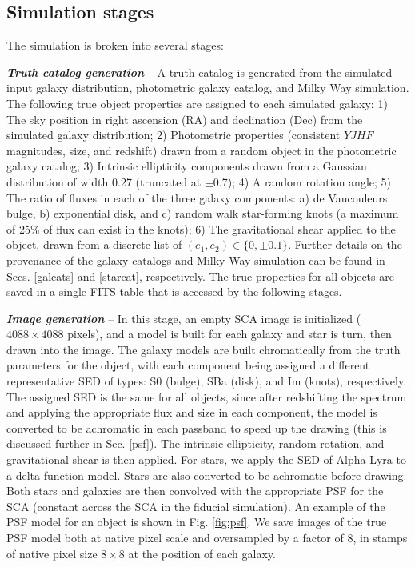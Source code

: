 \documentclass[aps,prd, amsmath,amssymb,superscriptaddress,showkeys,nofootinbib,reprint,preprintnumbers]{revtex4-1}
\begin{document}
\subsection{Simulation stages}\label{stages}

The simulation is broken into several stages:

\textbf{\textit{Truth catalog generation}} -- A truth catalog is generated from the simulated input galaxy distribution, photometric galaxy catalog, and Milky Way simulation. 
The following true object properties are assigned to each simulated galaxy:
1) The sky position in right ascension (RA) and declination (Dec) from the simulated galaxy distribution; 
2) Photometric properties (consistent $YJHF$ magnitudes, size, and redshift) drawn from a random object in the photometric galaxy catalog; 
3) Intrinsic ellipticity components drawn from a Gaussian distribution of width 0.27 (truncated at $\pm$0.7); 
4) A random rotation angle; 
5) The ratio of fluxes in each of the three galaxy components: a) de Vaucouleurs bulge, b) exponential disk, and c) random walk star-forming knots (a maximum of 25\% of flux can exist in the knots); 
6) The gravitational shear applied to the object, drawn from a discrete list of $(e_1, e_2) \in \{0,\pm 0.1\}$.
Further details on the provenance of the galaxy catalogs and Milky Way simulation can be found in Secs. \ref{galcats} and \ref{starcat}, respectively. 
The true properties for all objects are saved in a single FITS table that is accessed by the following stages.

\textbf{\textit{Image generation}} -- In this stage, an empty SCA image is initialized ($4088\times4088$ pixels), and a model is built for each galaxy and star is turn, then drawn into the image. 
The galaxy models are built chromatically from the truth parameters for the object, with each component being assigned a different representative SED of types: S0 (bulge), SBa (disk), and Im (knots), respectively. 
The assigned SED is the same for all objects, since after redshifting the spectrum and applying the appropriate flux and size in each component, the model is converted to be achromatic in each passband to speed up the drawing (this is discussed further in Sec. \ref{psf}). 
The intrinsic ellipticity, random rotation, and gravitational shear is then applied.
For stars, we apply the SED of Alpha Lyra to a delta function model. 
Stars are also converted to be achromatic before drawing.
Both stars and galaxies are then convolved with the appropriate PSF for the SCA (constant across the SCA in the fiducial simulation). An example of the PSF model for an object is shown in Fig. \ref{fig:psf}. We save images of the true PSF model both at native pixel scale and oversampled by a factor of 8, in stamps of native pixel size $8\times 8$ at the position of each galaxy.
\end{document}
